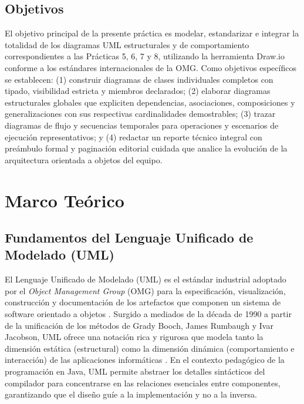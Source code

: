 \documentclass[letterpaper,12pt,oneside]{article}
\numberwithin{figure}{section}
\begin{document}
\subsection{Objetivos}
El objetivo principal de la presente pr\'actica es modelar, estandarizar e integrar la totalidad de los diagramas UML estructurales y de comportamiento correspondientes a las Pr\'acticas 5, 6, 7 y 8, utilizando la herramienta Draw.io conforme a los est\'andares internacionales de la OMG. Como objetivos espec\'ificos se establecen: (1) construir diagramas de clases individuales completos con tipado, visibilidad estricta y miembros declarados; (2) elaborar diagramas estructurales globales que expliciten dependencias, asociaciones, composiciones y generalizaciones con sus respectivas cardinalidades demostrables; (3) trazar diagramas de flujo y secuencias temporales para operaciones y escenarios de ejecuci\'on representativos; y (4) redactar un reporte t\'ecnico integral con pre\'ambulo formal y paginaci\'on editorial cuidada que analice la evoluci\'on de la arquitectura orientada a objetos del equipo.


\section{Marco Te\'orico}

\subsection{Fundamentos del Lenguaje Unificado de Modelado (UML)}
El Lenguaje Unificado de Modelado (UML) es el est\'andar industrial adoptado por el \textit{Object Management Group} (OMG) para la especificaci\'on, visualizaci\'on, construcci\'on y documentaci\'on de los artefactos que componen un sistema de software orientado a objetos \cite{booch2005}. Surgido a mediados de la d\'ecada de 1990 a partir de la unificaci\'on de los m\'etodos de Grady Booch, James Rumbaugh y Ivar Jacobson, UML ofrece una notaci\'on rica y rigurosa que modela tanto la dimensi\'on est\'atica (estructural) como la dimensi\'on din\'amica (comportamiento e interacci\'on) de las aplicaciones inform\'aticas \cite{fowler2004}. En el contexto pedag\'ogico de la programaci\'on en Java, UML permite abstraer los detalles sint\'acticos del compilador para concentrarse en las relaciones esenciales entre componentes, garantizando que el dise\~no gu\'ie a la implementaci\'on y no a la inversa.
\end{document}
